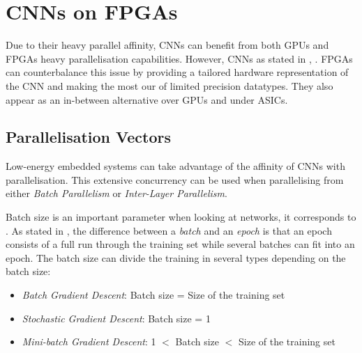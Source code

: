 
\section{CNNs on FPGAs}

Due to their heavy parallel affinity, CNNs can benefit from both GPUs \cite{Micikevicius2017, Jia2018, Kurth2018} and FPGAs \cite{Park2016, Liang2017, Colangelo2018, Jahanshahi2019, Bacchus2020} heavy parallelisation capabilities.
However, CNNs as stated in \cite{Jahanshahi2019}, . FPGAs can counterbalance this issue by providing a tailored hardware representation of the CNN and making the most our of limited precision datatypes. They also appear as an in-between alternative over GPUs and under ASICs.


\subsection{Parallelisation Vectors}

Low-energy embedded systems can take advantage of the affinity of CNNs with parallelisation. This extensive concurrency can be used when parallelising from either \emph{Batch Parallelism} or \emph{Inter-Layer Parallelism}.

Batch size is an important parameter when looking at networks, it corresponds to  \cite{MLMastery2019}. As stated in \cite{MLMastery2019}, the difference between a \emph{batch} and an \emph{epoch} is that an epoch consists of a full run through the training set while several batches can fit into an epoch. The batch size can divide the training in several types depending on the batch size:

\begin{itemize}
	\item \emph{Batch Gradient Descent}: Batch size = Size of the training set
	\item \emph{Stochastic Gradient Descent}: Batch size = 1
	\item \emph{Mini-batch Gradient Descent}: 1 $<$ Batch size $<$ Size of the training set
\end{itemize}

